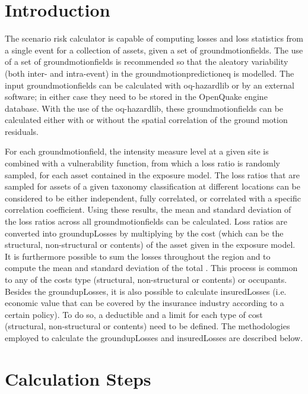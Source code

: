 

\section{Introduction}
The scenario risk calculator is capable of computing losses and loss statistics from a single event for a collection of assets, given a set of \glspl{groundmotionfield}. The use of a set of \glspl{groundmotionfield} is recommended so that the aleatory variability (both inter- and intra-event) in the \gls{groundmotionpredictioneq} is modelled. The input \glspl{groundmotionfield} can be calculated with oq-hazardlib or by an external software; in either case they need to be stored in the OpenQuake engine database. With the use of the oq-hazardlib, these \glspl{groundmotionfield} can be calculated either with or without the spatial correlation of the ground motion residuals.

For each \gls{groundmotionfield}, the intensity measure level at a given site is combined with a \gls{vulnerability function}, from which a loss ratio is randomly sampled, for each \gls{asset} contained in the \gls{exposure model}. The loss ratios that are sampled for \glspl{asset} of a given \gls{taxonomy} classification at different locations can be considered to be either independent, fully correlated, or correlated with a specific correlation coefficient. Using these results, the mean and standard deviation of the loss ratios across all \glspl{groundmotionfield} can be calculated. Loss ratios are converted into \gls{groundupLosses} by multiplying by the cost (which can be the structural, non-structural or contents) of the \gls{asset} given in the exposure model. It is furthermore possible to sum the losses throughout the region and to compute the mean and standard deviation of the total . This process is common to any of the costs type (structural, non-structural or contents) or occupants.
Besides the \gls{groundupLosses}, it is also possible to calculate \gls{insuredLosses} (i.e. economic value that can be covered by the insurance industry according to a certain policy). To do so, a \gls{deductible} and a \gls{limit} for each type of cost (structural, non-structural or contents) need to be defined. The methodologies employed to calculate the \gls{groundupLosses} and \gls{insuredLosses} are described below.

\section{Calculation Steps}

